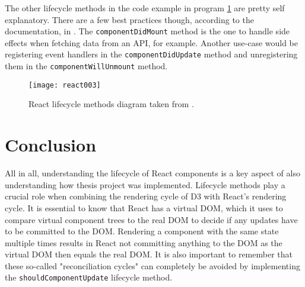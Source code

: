 The other lifecycle methods in the code example in program \ref{fig:reactLifecycleMethods} are pretty self explanatory. There are a few best practices though, according to the documentation, in \cite{React}. The \texttt{componentDidMount} method is the one to handle side effects when fetching data from an API, for example. Another use-case would be registering event handlers in the \texttt{componentDidUpdate} method and unregistering them in the \texttt{component\-Will\-Unmount} method.

\begin{figure}
  \centering
  \texttt{[image: react003]}
  \caption{React lifecycle methods diagram taken from \cite{ReactRenderCycleDiagram}.}
  \label{fig:reactLifecycleMethods}
\end{figure}

\section{Conclusion}

All in all, understanding the lifecycle of React components is a key aspect of also understanding how thesis project was implemented. Lifecycle methods play a crucial role when combining the rendering cycle of D3 with React's rendering cycle. It is essential to know that React has a virtual DOM, which it uses to compare virtual component trees to the real DOM to decide if any updates have to be committed to the DOM. Rendering a component with the same state multiple times results in React not committing anything to the DOM as the virtual DOM then equals the real DOM. It is also important to remember that these so-called "reconciliation cycles" can completely be avoided by implementing the \texttt{shouldComponentUpdate} lifecycle method.







